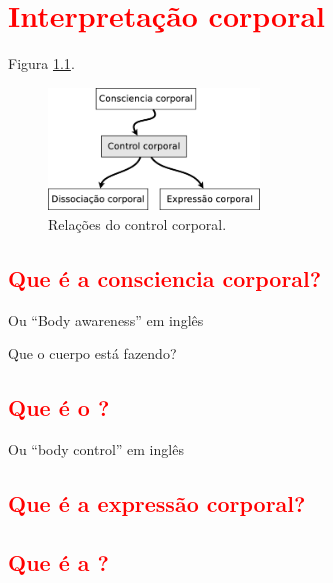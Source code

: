 

\chapter{\textcolor{red}{Interpretação corporal}}
\label{fig:bodyrelations}

Figura \ref{fig:bodycontroltotal}.

\begin{figure}[!h]
  \centering
    \includegraphics[width=0.5\textwidth]{chapters/cap-body/total.eps}
\caption{Relações do control corporal.}
\label{fig:bodycontroltotal}
\end{figure}


\section{\textcolor{red}{Que é a consciencia corporal?}}
\label{sec:BodyAwareness}
Ou ``Body awareness'' em inglês 
\cite[pp. 11]{balcells2002expresion}
\cite{bueno2016psicomotricidade}
\cite[pp. 232]{gaiarsameio}
\cite[pp. 61]{aranha2002desenvolvimento}
\cite[pp. 75]{vallejo2001cuerpo}

Que o cuerpo está fazendo? \cite[pp. 5]{carline2011lesson} \cite[pp. 27]{paine2014complete}
\section{\textcolor{red}{Que é o \Bodycontrol?}}
\label{sec:BodyControl}
 Ou ``body control'' em inglês 
\cite{bolio2006fantasia}
\cite[pp. 215]{moreno2008expresion}

\section{\textcolor{red}{Que é a expressão corporal?}}
\label{sec:BodyExpression}
\cite{balcells2002expresion}
\cite[pp. 215]{moreno2008expresion}

\section{\textcolor{red}{Que é a \bodyisolation?}}
\label{sec:BodyIsolation}






